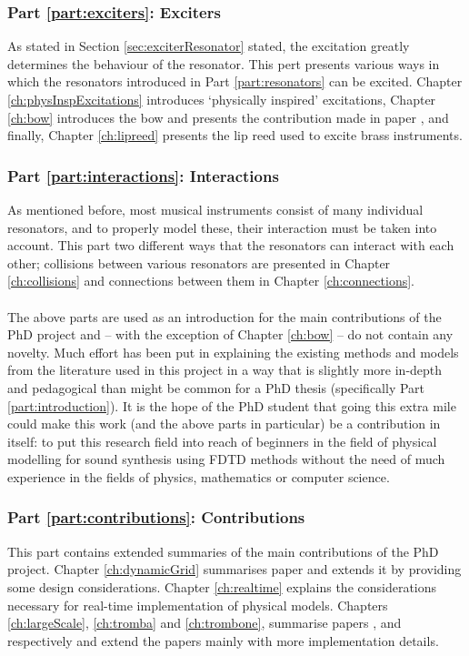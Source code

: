\subsubsection{Part \ref{part:exciters}: Exciters} 
As stated in Section \ref{sec:exciterResonator} stated, the excitation greatly determines the behaviour of the resonator. This pert
presents various ways in which the resonators introduced in Part \ref{part:resonators} can be excited. Chapter \ref{ch:physInspExcitations} introduces `physically inspired' excitations, Chapter \ref{ch:bow} introduces the bow and presents the contribution made in paper \citeP[C], and finally, Chapter \ref{ch:lipreed} presents the lip reed used to excite brass instruments.

\subsubsection{Part \ref{part:interactions}: Interactions}
As mentioned before, most musical instruments consist of many individual resonators, and to properly model these, their interaction must be taken into account. This part two different ways that the resonators can interact with each other; collisions between various resonators are presented in Chapter \ref{ch:collisions} and connections between them in Chapter \ref{ch:connections}. 
\\
\\

\noindent The above parts are used as an introduction for the main contributions of the PhD project and -- with the exception of Chapter \ref{ch:bow} -- do not contain any novelty. Much effort has been put in explaining the existing methods and models from the literature used in this project in a way that is slightly more in-depth and pedagogical than might be common for a PhD thesis (specifically Part \ref{part:introduction}). It is the hope of the PhD student that going this extra mile could make this work (and the above parts in particular) be a contribution in itself: to put this research field into reach of beginners in the field of physical modelling for sound synthesis using FDTD methods without the need of much experience in the fields of physics, mathematics or computer science. 
\\

\subsubsection{Part \ref{part:contributions}: Contributions} This part contains extended summaries of the main contributions of the PhD project. Chapter \ref{ch:dynamicGrid} summarises paper \citeP[G] and extends it by providing some design considerations. Chapter \ref{ch:realtime} explains the considerations necessary for real-time implementation of physical models. Chapters \ref{ch:largeScale}, \ref{ch:tromba} and \ref{ch:trombone}, summarise papers \citeP[A], \citeP[D] and \citeP[H] respectively and extend the papers mainly with more implementation details.

